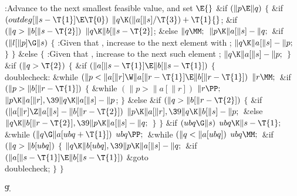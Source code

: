 \B{}:Advance  to the next smallest feasible
value, and set \X${}\E{}$\6
\&{if} ${}(\|p\E\|q){}$\5
${}\{{}$\1\6
\&{if} ${}(\\{outdeg}[\|s-\T{1}]\E\T{0}){}$\1\5
${}\|q\K(\|a[\|s]/\T{3})+\T{1}{}$;\2\6
\&{if} ${}(\|q>\|b[\|s-\T{2}]){}$\1\5
${}\|q\K\|b[\|s-\T{2}]{}$;\5
\2\&{else}\1\5
${}\|q\MM;{}$\2\6
${}\|p\K\|a[\|s]-\|q;{}$\6
\&{if} ${}(\|l[\|p]\G\|s){}$\5
${}\{{}$\1\6
:Given that , increase  to the next element with
\X;\6
${}\|q\K\|a[\|s]-\|p;{}$\6
\4${}\}{}$\2\6
\4${}\}{}$\5
\2\&{else}\5
${}\{{}$\1\6
:Given that , increase  to the next such element%
\X;\6
${}\|q\K\|a[\|s]-\|p;{}$\6
\4${}\}{}$\2\6
\&{if} ${}(\|q>\T{2}){}$\5
${}\{{}$\1\6
\&{if} ${}(\|a[\|s-\T{1}]\E\|b[\|s-\T{1}]){}$\5
${}\{{}$\1\6
\4\\{doublecheck}:\5
\&{while} ${}(\|p<\|a[\|r]\W\|a[\|r-\T{1}]\E\|b[\|r-\T{1}]){}$\1\5
${}\|r\MM;{}$\2\6
\&{if} ${}(\|p>\|b[\|r-\T{1}]){}$\5
${}\{{}$\1\6
\&{while} ${}(\|p>\|a[\|r]){}$\1\5
${}\|r\PP;{}$\2\6
${}\|p\K\|a[\|r],\39\|q\K\|a[\|s]-\|p{}$;\6
\4${}\}{}$\5
\2\&{else} \&{if} ${}(\|q>\|b[\|r-\T{2}]){}$\5
${}\{{}$\1\6
\&{if} ${}(\|a[\|r]\Z\|a[\|s]-\|b[\|r-\T{2}]){}$\1\5
${}\|p\K\|a[\|r],\39\|q\K\|b[\|s]-\|p;{}$\2\6
\&{else}\1\5
${}\|q\K\|b[\|r-\T{2}],\39\|p\K\|a[\|s]-\|q;{}$\2\6
\4${}\}{}$\2\6
\4${}\}{}$\2\6
\&{if} ${}(\\{ubq}\G\|s){}$\1\5
${}\\{ubq}\K\|s-\T{1};{}$\2\6
\&{while} ${}(\|q\G\|a[\\{ubq}+\T{1}]){}$\1\5
${}\\{ubq}\PP;{}$\2\6
\&{while} ${}(\|q<\|a[\\{ubq}]){}$\1\5
${}\\{ubq}\MM;{}$\2\6
\&{if} ${}(\|q>\|b[\\{ubq}]){}$\5
${}\{{}$\1\6
${}\|q\K\|b[\\{ubq}],\39\|p\K\|a[\|s]-\|q;{}$\6
\&{if} ${}(\|a[\|s-\T{1}]\E\|b[\|s-\T{1}]){}$\1\5
\&{goto} \\{doublecheck};\2\6
\4${}\}{}$\2\6
\4${}\}{}$\2\par
\U9.\fi

